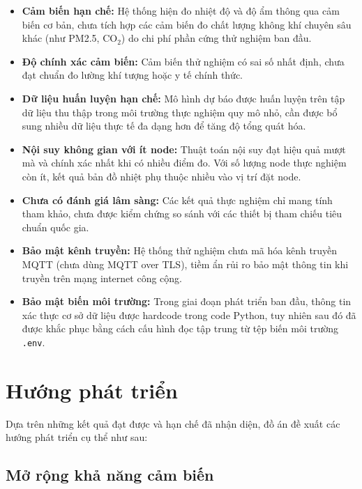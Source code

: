 \begin{itemize}[leftmargin=2cm]
  \item \textbf{Cảm biến hạn chế:} Hệ thống hiện đo nhiệt độ và độ ẩm thông qua cảm biến cơ bản, chưa tích hợp các cảm biến đo chất lượng không khí chuyên sâu khác (như PM2.5, CO$_2$) do chi phí phần cứng thử nghiệm ban đầu.
  \item \textbf{Độ chính xác cảm biến:} Cảm biến thử nghiệm có sai số nhất định, chưa đạt chuẩn đo lường khí tượng hoặc y tế chính thức.
  \item \textbf{Dữ liệu huấn luyện hạn chế:} Mô hình dự báo được huấn luyện trên tập dữ liệu thu thập trong môi trường thực nghiệm quy mô nhỏ, cần được bổ sung nhiều dữ liệu thực tế đa dạng hơn để tăng độ tổng quát hóa.
  \item \textbf{Nội suy không gian với ít node:} Thuật toán nội suy đạt hiệu quả mượt mà và chính xác nhất khi có nhiều điểm đo. Với số lượng node thực nghiệm còn ít, kết quả bản đồ nhiệt phụ thuộc nhiều vào vị trí đặt node.
  \item \textbf{Chưa có đánh giá lâm sàng:} Các kết quả thực nghiệm chỉ mang tính tham khảo, chưa được kiểm chứng so sánh với các thiết bị tham chiếu tiêu chuẩn quốc gia.
  \item \textbf{Bảo mật kênh truyền:} Hệ thống thử nghiệm chưa mã hóa kênh truyền MQTT (chưa dùng MQTT over TLS), tiềm ẩn rủi ro bảo mật thông tin khi truyền trên mạng internet công cộng.
  \item \textbf{Bảo mật biến môi trường:} Trong giai đoạn phát triển ban đầu, thông tin xác thực cơ sở dữ liệu được hardcode trong code Python, tuy nhiên sau đó đã được khắc phục bằng cách cấu hình đọc tập trung từ tệp biến môi trường \texttt{.env}.
\end{itemize}

\section{Hướng phát triển}
\label{sec:conclusion:future}

Dựa trên những kết quả đạt được và hạn chế đã nhận diện, đồ án đề xuất các hướng phát triển cụ thể như sau:

\subsection{Mở rộng khả năng cảm biến}
\label{subsec:future:sensor}

